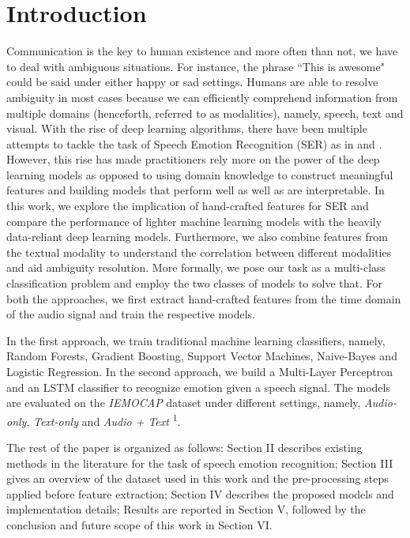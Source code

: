 \documentclass[conference]{IEEEtran}
\begin{document}
\section{Introduction}
Communication is the key to human existence and more often than not, we have to deal with ambiguous situations. For instance, the phrase ``This is awesome" could be said under either happy or sad settings. Humans are able to resolve ambiguity in most cases because we can efficiently comprehend information from multiple domains (henceforth, referred to as modalities), namely, speech, text and visual. With the rise of deep learning algorithms, there have been multiple attempts to tackle the task of Speech Emotion Recognition (SER) as in \cite{huang2014speech} \cite{yoon2018multimodal} and \cite{han2014speech}. However, this rise has made practitioners rely more on the power of the deep learning models as opposed to using domain knowledge to construct meaningful features and building models that perform well as well as are interpretable. In this work, we explore the implication of hand-crafted features for SER and compare the performance of lighter machine learning models with the heavily data-reliant deep learning models. Furthermore, we also combine features from the textual modality to understand the correlation between different modalities and aid ambiguity resolution. More formally, we pose our task as a multi-class classification problem and employ the two classes of models to solve that. For both the approaches, we first extract hand-crafted features from the time domain of the audio signal and train the respective models.

In the first approach, we train traditional machine learning classifiers, namely, Random Forests, Gradient Boosting, Support Vector Machines, Naive-Bayes and Logistic Regression. In the second approach, we build a Multi-Layer Perceptron and an LSTM \cite{hochreiter1997long} classifier to recognize emotion given a speech signal. The models are evaluated on the \textit{IEMOCAP} \cite{busso2008iemocap} dataset under different settings, namely, \textit{Audio-only}, \textit{Text-only} and \textit{Audio + Text} \textsuperscript{1}.

The rest of the paper is organized as follows: Section II describes existing methods in the literature for the task of speech emotion recognition; Section III gives an overview of the dataset used in this work and the pre-processing steps applied before feature extraction; Section IV describes the proposed models and implementation details; Results are reported in Section V, followed by the conclusion and future scope of this work in Section VI.
\end{document}
